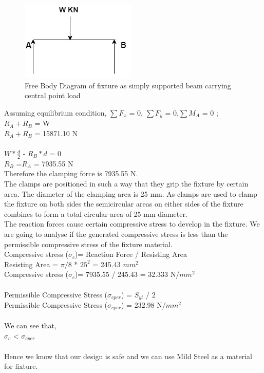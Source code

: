\documentclass[16pt,a4paper]{article}
\begin{document}
\begin{figure}[h]
\centering
\includegraphics[scale=0.8]{Simply Supported Beam}
\caption{Free Body Diagram of fixture as simply supported beam carrying central point load}
\label{fig:Simply Supported Beam}
\end{figure}

Assuming equilibrium condition,           
$\sum F_x$ = 0, $\sum F_y$ = 0,$\sum M_A$  = 0 ; 
\\$R_A +  R_B$ = W
\\$R_A +  R_B$ = 15871.10 N \\    
\\$W*\frac {d}{2}$ - $R_B * d$ = 0
\\$R_B$ =$R_A$ = 7935.55 N
\\Therefore the clamping force is 7935.55 N.
\\The clamps are positioned in such a way that they grip the fixture by certain area. The diameter of the clamping area is 25 mm. As clamps are used to clamp the fixture on both sides the semicircular areas on either sides of the fixture combines to form a total circular area of 25 mm diameter.
\\The reaction forces cause certain compressive stress to develop in the fixture. We are going to analyse if the generated compressive stress is less than the permissible compressive stress of the fixture material. 
\\Compressive stress ($\sigma_c$)= Reaction Force / Resisting Area
\\Resisting Area = $\pi / 8$ * $25^2$ = 245.43 $mm^2$
\\Compressive stress ($\sigma_c$)= 7935.55 / 245.43 = 32.333 N/$mm^2$\\    
\\Permissible Compressive Stress ($\sigma_{cper}$) = $S_{yt}$ / 2
\\Permissible Compressive Stress ($\sigma_{cper}$) = 232.98 N/$mm^2$\\   
\\We can see that,
\\$\sigma_c$ < $\sigma_{cper}$\\    
\\Hence we know that our design is safe and we can use Mild Steel as a material for fixture.
\end{document}
